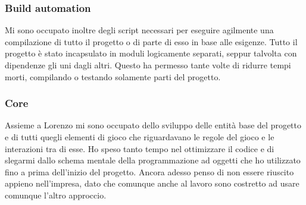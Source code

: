 \subsubsection{Build automation}
Mi sono occupato inoltre degli script necessari per eseguire agilmente una compilazione di tutto il progetto o di parte di esso in base alle esigenze.
Tutto il progetto è stato incapsulato in moduli logicamente separati, seppur talvolta con dipendenze gli uni dagli altri.
Questo ha permesso tante volte di ridurre tempi morti, compilando o testando solamente parti del progetto.
\subsubsection{Core}
Assieme a Lorenzo mi sono occupato dello sviluppo delle entità base del progetto e di tutti quegli elementi di gioco che riguardavano le regole del gioco e le interazioni tra di esse.
Ho speso tanto tempo nel ottimizzare il codice e di slegarmi dallo schema mentale della programmazione ad oggetti che ho utilizzato fino a prima dell'inizio del progetto.
Ancora adesso penso di non essere riuscito appieno nell'impresa, dato che comunque anche al lavoro sono costretto ad usare comunque l'altro approccio.
\newpage